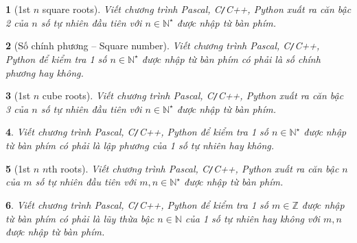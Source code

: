 \documentclass{article}
\newtheorem{baitoan}{}
\begin{document}
\begin{baitoan}[1st $n$ square roots]
	Viết chương trình {\sf Pascal, C{\tt/}C++, Python} xuất ra căn bậc 2 của $n$ số tự nhiên đầu tiên với $n\in\mathbb{N}^\star$ được nhập từ bàn phím.
\end{baitoan}

\begin{baitoan}[Số chính phương -- Square number]
	Viết chương trình {\sf Pascal, C{\tt/}C++, Python} để kiểm tra 1 số $n\in\mathbb{N}^\star$ được nhập từ bàn phím có phải là số chính phương hay không.
\end{baitoan}

\begin{baitoan}[1st $n$ cube roots]
	Viết chương trình {\sf Pascal, C{\tt/}C++, Python} xuất ra căn bậc 3 của $n$ số tự nhiên đầu tiên với $n\in\mathbb{N}^\star$ được nhập từ bàn phím.
\end{baitoan}

\begin{baitoan}
	Viết chương trình {\sf Pascal, C{\tt/}C++, Python} để kiểm tra 1 số $n\in\mathbb{N}^\star$ được nhập từ bàn phím có phải là lập phương của 1 số tự nhiên hay không.
\end{baitoan}

\begin{baitoan}[1st $n$ $n$th roots]
	Viết chương trình {\sf Pascal, C{\tt/}C++, Python} xuất ra căn bậc $n$ của $m$ số tự nhiên đầu tiên với $m,n\in\mathbb{N}^\star$ được nhập từ bàn phím.
\end{baitoan}

\begin{baitoan}
	Viết chương trình {\sf Pascal, C{\tt/}C++, Python} để kiểm tra 1 số $m\in\mathbb{Z}$ được nhập từ bàn phím có phải là lũy thừa bậc $n\in\mathbb{N}$ của 1 số tự nhiên hay không với $m,n$ được nhập từ bàn phím.
\end{baitoan}
\end{document}
